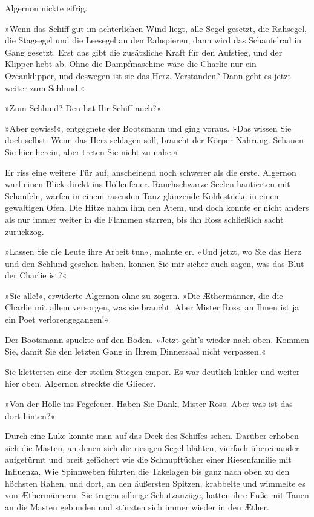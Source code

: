 Algernon nickte eifrig.

»Wenn das Schiff gut im achterlichen Wind liegt, alle Segel
gesetzt, die Rahsegel, die Stagsegel und die Leesegel an den
Rahspieren, dann wird das Schaufelrad in Gang gesetzt. Erst das
gibt die zusätzliche Kraft für den Aufstieg, und der Klipper hebt
ab. Ohne die Dampfmaschine wäre die Charlie nur ein Ozeanklipper,
und deswegen ist sie das Herz. Verstanden? Dann geht es jetzt
weiter zum Schlund.«

»Zum Schlund? Den hat Ihr Schiff auch?«

»Aber gewiss!«, entgegnete der Bootsmann und ging voraus. »Das
wissen Sie doch selbst: Wenn das Herz schlagen soll, braucht der
Körper Nahrung. Schauen Sie hier herein, aber treten Sie nicht zu
nahe.«

Er riss eine weitere Tür auf, anscheinend noch schwerer als die
erste. Algernon warf einen Blick direkt ins Höllenfeuer.
Rauchschwarze Seelen hantierten mit Schaufeln, warfen in einem
rasenden Tanz glänzende Kohlestücke in einen gewaltigen Ofen. Die
Hitze nahm ihm den Atem, und doch konnte er nicht anders als nur
immer weiter in die Flammen starren, bis ihn Ross schließlich sacht
zurückzog.

»Lassen Sie die Leute ihre Arbeit tun«, mahnte er. »Und jetzt, wo
Sie das Herz und den Schlund gesehen haben, können Sie mir sicher
auch sagen, was das Blut der Charlie ist?«

»Sie alle!«, erwiderte Algernon ohne zu zögern. »Die Æthermänner,
die die Charlie mit allem versorgen, was sie braucht. Aber Mister
Ross, an Ihnen ist ja ein Poet verlorengegangen!«

Der Bootsmann spuckte auf den Boden. »Jetzt geht’s wieder nach
oben. Kommen Sie, damit Sie den letzten Gang in Ihrem Dinnersaal
nicht verpassen.«

\bigpar

Sie kletterten eine der steilen Stiegen empor. Es war deutlich
kühler und weiter hier oben. Algernon streckte die Glieder.

»Von der Hölle ins Fegefeuer. Haben Sie Dank, Mister Ross. Aber was
ist das dort hinten?«

Durch eine Luke konnte man auf das Deck des Schiffes sehen. Darüber
erhoben sich die Masten, an denen sich die riesigen Segel blähten,
vierfach übereinander aufgetürmt und breit gefächert wie die
Schnupftücher einer Riesenfamilie mit Influenza. Wie Spinnweben
führten die Takelagen bis ganz nach oben zu den höchsten Rahen, und
dort, an den äußersten Spitzen, krabbelte und wimmelte es von
Æthermännern. Sie trugen silbrige Schutzanzüge, hatten ihre Füße
mit Tauen an die Masten gebunden und stürzten sich immer wieder in
den Æther.

